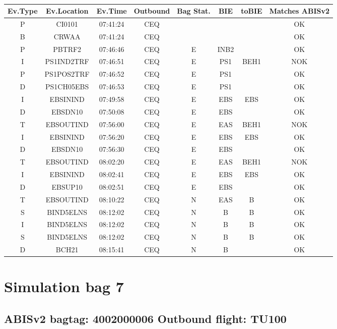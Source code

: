 \documentclass{report}
\begin{document}
\paragraph{}
\begin{longtable}{cccccccc}    \toprule
\rowcolor{white!50}
\textbf{Ev.Type} & \textbf{Ev.Location} & \textbf{Ev.Time} & \textbf{Outbound} & \textbf{Bag Stat.} & \textbf{BIE} & \textbf{toBIE} & \textbf{Matches ABISv2} \\\midrule
P & CI0101 & 07:41:24  & CEQ &  &  &  & OK\\
B & CRWAA & 07:41:24  & CEQ &  &  &  & OK\\
P & PBTRF2 & 07:46:46  & CEQ & E & INB2 &  & OK\\
I & PS1IND2TRF & 07:46:51  & CEQ & E & PS1 & BEH1 & NOK\\
P & PS1POS2TRF & 07:46:52  & CEQ & E & PS1 &  & OK\\
D & PS1CH05EBS & 07:46:53  & CEQ & E & PS1 &  & OK\\
I & EBSININD & 07:49:58  & CEQ & E & EBS & EBS & OK\\
D & EBSDN10 & 07:50:08  & CEQ & E & EBS &  & OK\\
T & EBSOUTIND & 07:56:00  & CEQ & E & EAS & BEH1 & NOK\\
I & EBSININD & 07:56:20  & CEQ & E & EBS & EBS & OK\\
D & EBSDN10 & 07:56:30  & CEQ & E & EBS &  & OK\\
T & EBSOUTIND & 08:02:20  & CEQ & E & EAS & BEH1 & NOK\\
I & EBSININD & 08:02:41  & CEQ & E & EBS & EBS & OK\\
D & EBSUP10 & 08:02:51  & CEQ & E & EBS &  & OK\\
T & EBSOUTIND & 08:10:22  & CEQ & N & EAS & B & OK\\
S & BIND5ELNS & 08:12:02  & CEQ & N & B & B & OK\\
I & BIND5ELNS & 08:12:02  & CEQ & N & B & B & OK\\
S & BIND5ELNS & 08:12:02  & CEQ & N & B & B & OK\\
D & BCH21 & 08:15:41  & CEQ & N & B &  & OK\\
\bottomrule
\end{longtable}
\pagebreak
\section*{Simulation bag 7}
\subsection*{ABISv2 bagtag: 4002000006 Outbound flight: TU100}
\end{document}
